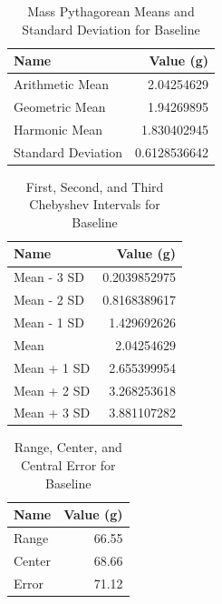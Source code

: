 \begin{table}
    \centering
	\begin{tabular}{|l|r|} \hline
		\textbf{Name} & \textbf{Value (g)} \\
        \hline
		Arithmetic Mean & 2.04254629 \\
		Geometric Mean & 1.94269895 \\
        Harmonic Mean & 1.830402945 \\
        Standard Deviation & 0.6128536642 \\
		\hline
	\end{tabular}
	\caption{Mass Pythagorean Means and Standard Deviation for Baseline}
	\label{table.baseline.means}
\end{table}
\begin{table}
    \centering
	\begin{tabular}{|l|r|} \hline
		\textbf{Name} & \textbf{Value (g)} \\
		\hline
		Mean - 3 SD & 0.2039852975 \\
		Mean - 2 SD & 0.8168389617 \\
        Mean - 1 SD & 1.429692626 \\
        Mean & 2.04254629 \\
		Mean + 1 SD & 2.655399954 \\
        Mean + 2 SD & 3.268253618 \\
		Mean + 3 SD & 3.881107282 \\
		\hline
	\end{tabular}
	\caption{First, Second, and Third Chebyshev Intervals for Baseline}
	\label{table.baseline.chebyshev}
\end{table}
\begin{table}
    \centering
	\begin{tabular}{|l|r|} \hline
		\textbf{Name} & \textbf{Value (g)} \\
		\hline
		Range & 66.55 \\
	    Center & 68.66 \\
		Error & 71.12 \\
		\hline
	\end{tabular}
	\caption{Range, Center, and Central Error for Baseline}
	\label{table.baseline.range}
\end{table}
